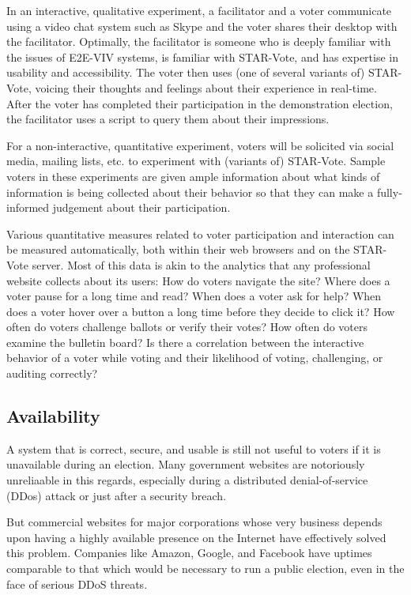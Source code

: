 In an interactive, qualitative experiment, a facilitator and a voter
communicate using a video chat system such as Skype and the voter
shares their desktop with the facilitator. Optimally, the facilitator
is someone who is deeply familiar with the issues of E2E-VIV systems,
is familiar with STAR-Vote, and has expertise in usability and
accessibility. The voter then uses (one of several variants of)
STAR-Vote, voicing their thoughts and feelings about their experience
in real-time. After the voter has completed their participation in the
demonstration election, the facilitator uses a script to query them
about their impressions.

For a non-interactive, quantitative experiment, voters will be
solicited via social media, mailing lists, etc. to experiment with
(variants of) STAR-Vote. Sample voters in these experiments are given
ample information about what kinds of information is being collected
about their behavior so that they can make a fully-informed judgement
about their participation.

Various quantitative measures related to voter participation and
interaction can be measured automatically, both within their web
browsers and on the STAR-Vote server. Most of this data is akin to the
analytics that any professional website collects about its users: How
do voters navigate the site?  Where does a voter pause for a long time
and read?  When does a voter ask for help?  When does a voter hover
over a button a long time before they decide to click it?  How often
do voters challenge ballots or verify their votes?  How often do
voters examine the bulletin board?  Is there a correlation between the
interactive behavior of a voter while voting and their likelihood of
voting, challenging, or auditing correctly?

\subsection{Availability}

A system that is correct, secure, and usable is still not useful to
voters if it is unavailable during an election. Many government
websites are notoriously unreliaable in this regards, especially
during a distributed denial-of-service (DDos) attack or just after a
security breach.

But commercial websites for major corporations whose very business
depends upon having a highly available presence on the Internet have
effectively solved this problem. Companies like Amazon, Google, and
Facebook have uptimes comparable to that which would be necessary to
run a public election, even in the face of serious DDoS threats.

